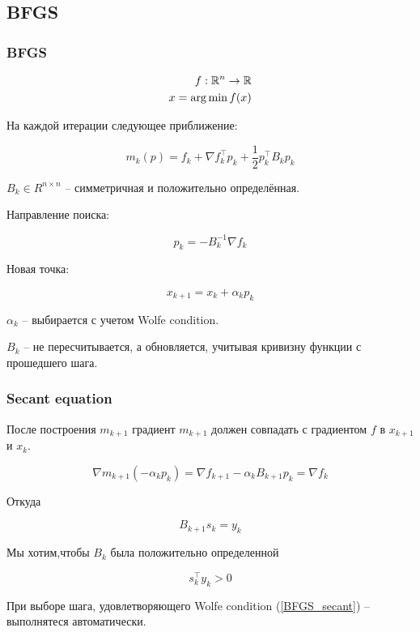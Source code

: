 \subsection{BFGS}

\begin{frame}
  \frametitle{BFGS}
    \begin{align*}
      f : \mathbb{R}^n \rightarrow \mathbb{R} \\
      x = \operatorname*{arg\,min} f(x)
    \end{align*}

    На каждой итерации следующее приближение:

    \begin{equation*}
      m_k(p) = f_k + \nabla f_k^\intercal p_k + \frac{1}{2} p_k^\intercal B_k p_k
    \end{equation*}

    $B_k \in R^{n \times  n}$ -- симметричная и положительно определённая.  

\end{frame}

\begin{frame}
    Направление поиска:

    \begin{equation*}
      p_k = - B_k^{-1} \nabla f_k
    \end{equation*}
    
    Новая точка:

    \begin{equation*}
      x_{k+1} = x_k + \alpha_k p_k
    \end{equation*}

    $\alpha_k$ -- выбирается с учетом Wolfe condition.

    $B_k$ -- не пересчитывается, а обновляется, учитывая кривизну функции с прошедшего шага.
\end{frame}

\begin{frame}
  \frametitle{Secant equation}
  
  После построения $m_{k+1}$ градиент $m_{k+1}$ должен совпадать с градиентом $f$ в $x_{k+1}$ и $x_k$.

  \begin{equation*}
    \nabla m_{k+1} (-\alpha_k p_k) = \nabla f_{k+1} - \alpha_k B_{k+1} p_k = \nabla f_k 
  \end{equation*}

  Откуда 

  \begin{equation*}
    B_{k+1} s_k = y_k
  \end{equation*}

  Мы хотим,чтобы  $B_k$ была положительно определенной 

  \begin{equation} \label{BFGS_secant}
    s_k^\intercal y_k > 0
  \end{equation}

  При выборе шага, удовлетворяющего Wolfe condition (\ref{BFGS_secant}) -- выполнятеся автоматически.
\end{frame}

